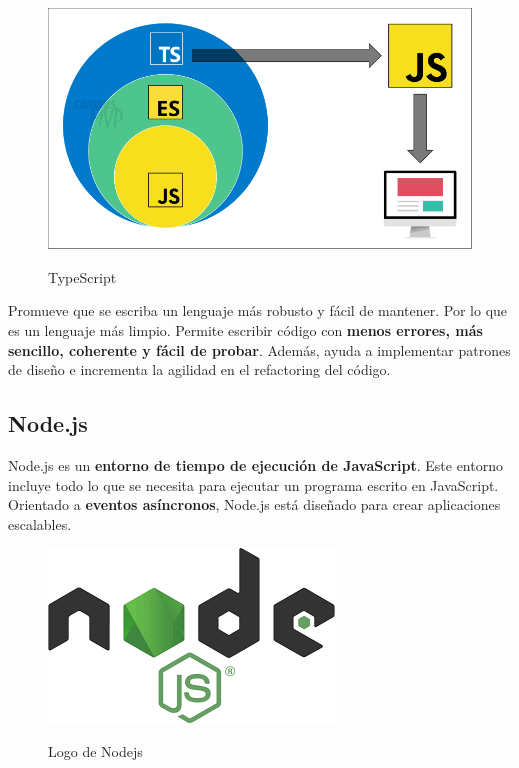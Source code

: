 \documentclass[12pt,twoside,titlepage]{report}
\begin{document}
\begin{figure}[H]
    \centering
    \includegraphics[scale=0.35]{TypeScript/TypeScriptTranspile}
    \label{fig:TypeScript}
    \caption{TypeScript}
\end{figure}

Promueve que se escriba un lenguaje más robusto y fácil de mantener. Por lo que es un lenguaje más limpio. Permite escribir código con \textbf{menos errores, más sencillo, coherente y fácil de probar}. Además, ayuda a implementar patrones de diseño e incrementa la agilidad en el refactoring del código.

\subsection{Node.js}

Node.js es un \textbf{entorno de tiempo de ejecución de JavaScript}. Este entorno incluye todo lo que se necesita para ejecutar un programa escrito en JavaScript. Orientado a \textbf{eventos asíncronos}, Node.js está diseñado para crear aplicaciones escalables.

\begin{figure}[H]
    \centering
    \includegraphics[scale=0.4]{Nodejs/Nodejs}
    \label{fig:NodejsLogo}
    \caption{Logo de Nodejs}
\end{figure}
\end{document}
